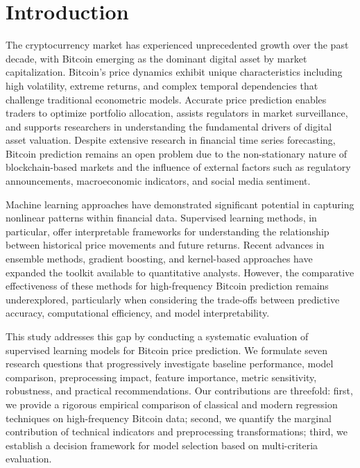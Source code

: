 \documentclass[conference]{IEEEtran}
\begin{document}
\section{Introduction}
\label{sec:introduction}

The cryptocurrency market has experienced unprecedented growth over the past decade, with Bitcoin emerging as the dominant digital asset by market capitalization.
Bitcoin's price dynamics exhibit unique characteristics including high volatility, extreme returns, and complex temporal dependencies that challenge traditional econometric models.
Accurate price prediction enables traders to optimize portfolio allocation, assists regulators in market surveillance, and supports researchers in understanding the fundamental drivers of digital asset valuation.
Despite extensive research in financial time series forecasting, Bitcoin prediction remains an open problem due to the non-stationary nature of blockchain-based markets and the influence of external factors such as regulatory announcements, macroeconomic indicators, and social media sentiment.

Machine learning approaches have demonstrated significant potential in capturing nonlinear patterns within financial data.
Supervised learning methods, in particular, offer interpretable frameworks for understanding the relationship between historical price movements and future returns.
Recent advances in ensemble methods, gradient boosting, and kernel-based approaches have expanded the toolkit available to quantitative analysts.
However, the comparative effectiveness of these methods for high-frequency Bitcoin prediction remains underexplored, particularly when considering the trade-offs between predictive accuracy, computational efficiency, and model interpretability.

This study addresses this gap by conducting a systematic evaluation of supervised learning models for Bitcoin price prediction.
We formulate seven research questions that progressively investigate baseline performance, model comparison, preprocessing impact, feature importance, metric sensitivity, robustness, and practical recommendations.
Our contributions are threefold:
first, we provide a rigorous empirical comparison of classical and modern regression techniques on high-frequency Bitcoin data;
second, we quantify the marginal contribution of technical indicators and preprocessing transformations;
third, we establish a decision framework for model selection based on multi-criteria evaluation.
\end{document}
